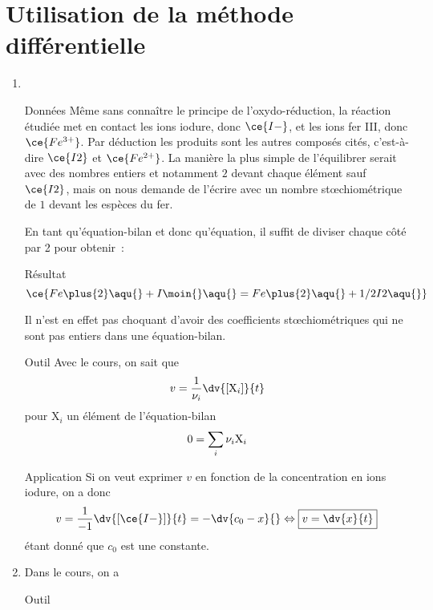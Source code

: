 \documentclass[a4paper, 12pt, final, garamond]{book}
\begin{document}
\section{Utilisation de la méthode différentielle}
\begin{enumerate}
    \item~
        \begin{rdefi}{Données}
            Même sans connaître le principe de l'oxydo-réduction, la réaction
            étudiée met en contact les ions iodure, donc $\ce{I-}$, et les ions
            fer III, donc $\ce{Fe^{3+}}$. Par déduction les produits sont les
            autres composés cités, c'est-à-dire $\ce{I2}$ et $\ce{Fe^{2+}}$. La
            manière la plus simple de l'équilibrer serait avec des nombres
            entiers et notamment $2$ devant chaque élément sauf $\ce{I2}$, mais
            on nous demande de l'écrire avec un nombre stœchiométrique de $1$
            devant les espèces du fer.
        \end{rdefi}
        En tant qu'équation-bilan et donc qu'équation, il suffit de diviser
        chaque côté par 2 pour obtenir~:
        \begin{rprop}{Résultat}
            \[\ce{Fe\plus{2}\aqu{} + I\moin{}\aqu{} = Fe\plus{2}\aqu{} +
        1/2I2\aqu{}}\]
        \end{rprop}
        Il n'est en effet pas choquant d'avoir des coefficients stœchiométriques
        qui ne sont pas entiers dans une équation-bilan. \bigbreak
        \begin{rrapp}{Outil}
            Avec le cours, on sait que
            \[v = \frac{1}{\nu_i} \dv{[{\rm X}_i]}{t}\]
            pour X$_i$ un élément de l'équation-bilan
            \[0 = \sum_{i} \nu_i{\rm X}_i\]
        \end{rrapp}
        \begin{rexem}{Application}
            Si on veut exprimer $v$ en fonction de la concentration en ions iodure,
            on a donc
            \begin{gather*}
                v = \frac{1}{-1} \dv{[\ce{I-}]}{t}
                = - \dv{c_0 - x}{}
                \Leftrightarrow
                \boxed{v = \dv{x}{t}}
            \end{gather*}
            étant donné que $c_0$ est une constante.
        \end{rexem}
    \item Dans le cours, on a
        \begin{rrapp}{Outil}

\end{rrapp}
\end{enumerate}
\end{document}
